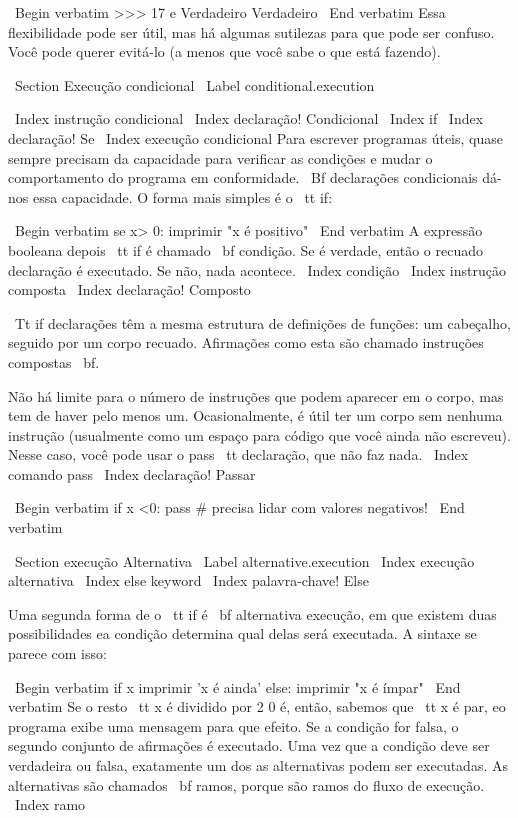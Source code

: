 \documentclass[10pt]{book}
\begin{document}
{{\ Begin {verbatim}
>>> 17 e Verdadeiro
Verdadeiro
\ End {verbatim}
%
Essa flexibilidade pode ser útil, mas há algumas sutilezas para
que pode ser confuso. Você pode querer evitá-lo (a menos que
você sabe o que está fazendo).


\ Section {Execução condicional}
\ Label {} conditional.execution

\ Index {instrução condicional}
\ Index {declaração! Condicional}
\ Index {if}
\ Index {declaração! Se}
\ Index {} execução condicional
Para escrever programas úteis, quase sempre precisam da capacidade
para verificar as condições e mudar o comportamento do programa
em conformidade. {\ Bf declarações condicionais} dá-nos essa capacidade. O
forma mais simples é o {\ tt if}:

\ Begin {verbatim}
se x> 0:
    imprimir "x é positivo"
\ End {verbatim}
%
A expressão booleana depois {\ tt if} é
chamado {\ bf condição}. Se é verdade, então o recuado
declaração é executado. Se não, nada acontece.
\ Index {condição}
\ Index {instrução composta}
\ Index {declaração! Composto}

{\ Tt if} declarações têm a mesma estrutura de definições de funções:
um cabeçalho, seguido por um corpo recuado. Afirmações como esta são
chamado {instruções compostas \ bf}.

Não há limite para o número de instruções que podem aparecer em
o corpo, mas tem de haver pelo menos um.
Ocasionalmente, é útil ter um corpo sem nenhuma instrução (usualmente
como um espaço para código que você ainda não escreveu). Nesse
caso, você pode usar o {pass \ tt} declaração, que não faz nada.
\ Index {comando pass}
\ Index {declaração! Passar}

\ Begin {verbatim}
if x <0:
    pass # precisa lidar com valores negativos!
\ End {verbatim}
%

\ Section {execução Alternativa}
\ Label {} alternative.execution
\ Index {execução alternativa}
\ Index {else keyword}
\ Index {palavra-chave! Else}

Uma segunda forma de o {\ tt if} é {\ bf alternativa execução},
em que existem duas possibilidades ea condição determina
qual delas será executada. A sintaxe se parece com isso:

\ Begin {verbatim}
if x%
    imprimir 'x é ainda'
else:
    imprimir "x é ímpar"
\ End {verbatim}
%
Se o resto {\ tt x} é dividido por 2 0 é, então,
sabemos que {\ tt x} é par, eo programa exibe uma mensagem para que
efeito. Se a condição for falsa, o segundo conjunto de afirmações é
executado. Uma vez que a condição deve ser verdadeira ou falsa, exatamente um dos
as alternativas podem ser executadas. As alternativas são chamados
{\ bf ramos}, porque são ramos do fluxo de execução.
\ Index {ramo}



}}
\end{document}
